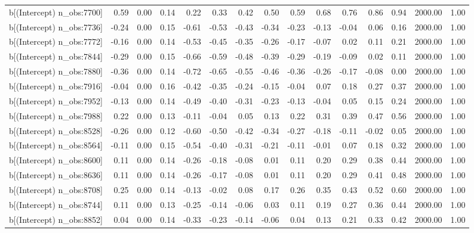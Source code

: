 \begin{table}[ht]
\begin{tabular}{rrrrrrrrrrrrrrr}
  b[(Intercept) n\_obs:7700] & 0.59 & 0.00 & 0.14 & 0.22 & 0.33 & 0.42 & 0.50 & 0.59 & 0.68 & 0.76 & 0.86 & 0.94 & 2000.00 & 1.00 \\ 
  b[(Intercept) n\_obs:7736] & -0.24 & 0.00 & 0.15 & -0.61 & -0.53 & -0.43 & -0.34 & -0.23 & -0.13 & -0.04 & 0.06 & 0.16 & 2000.00 & 1.00 \\ 
  b[(Intercept) n\_obs:7772] & -0.16 & 0.00 & 0.14 & -0.53 & -0.45 & -0.35 & -0.26 & -0.17 & -0.07 & 0.02 & 0.11 & 0.21 & 2000.00 & 1.00 \\ 
  b[(Intercept) n\_obs:7844] & -0.29 & 0.00 & 0.15 & -0.66 & -0.59 & -0.48 & -0.39 & -0.29 & -0.19 & -0.09 & 0.02 & 0.11 & 2000.00 & 1.00 \\ 
  b[(Intercept) n\_obs:7880] & -0.36 & 0.00 & 0.14 & -0.72 & -0.65 & -0.55 & -0.46 & -0.36 & -0.26 & -0.17 & -0.08 & 0.00 & 2000.00 & 1.00 \\ 
  b[(Intercept) n\_obs:7916] & -0.04 & 0.00 & 0.16 & -0.42 & -0.35 & -0.24 & -0.15 & -0.04 & 0.07 & 0.18 & 0.27 & 0.37 & 2000.00 & 1.00 \\ 
  b[(Intercept) n\_obs:7952] & -0.13 & 0.00 & 0.14 & -0.49 & -0.40 & -0.31 & -0.23 & -0.13 & -0.04 & 0.05 & 0.15 & 0.24 & 2000.00 & 1.00 \\ 
  b[(Intercept) n\_obs:7988] & 0.22 & 0.00 & 0.13 & -0.11 & -0.04 & 0.05 & 0.13 & 0.22 & 0.31 & 0.39 & 0.47 & 0.56 & 2000.00 & 1.00 \\ 
  b[(Intercept) n\_obs:8528] & -0.26 & 0.00 & 0.12 & -0.60 & -0.50 & -0.42 & -0.34 & -0.27 & -0.18 & -0.11 & -0.02 & 0.05 & 2000.00 & 1.00 \\ 
  b[(Intercept) n\_obs:8564] & -0.11 & 0.00 & 0.15 & -0.54 & -0.40 & -0.31 & -0.21 & -0.11 & -0.01 & 0.07 & 0.18 & 0.32 & 2000.00 & 1.00 \\ 
  b[(Intercept) n\_obs:8600] & 0.11 & 0.00 & 0.14 & -0.26 & -0.18 & -0.08 & 0.01 & 0.11 & 0.20 & 0.29 & 0.38 & 0.44 & 2000.00 & 1.00 \\ 
  b[(Intercept) n\_obs:8636] & 0.11 & 0.00 & 0.14 & -0.26 & -0.17 & -0.08 & 0.01 & 0.11 & 0.20 & 0.29 & 0.41 & 0.48 & 2000.00 & 1.00 \\ 
  b[(Intercept) n\_obs:8708] & 0.25 & 0.00 & 0.14 & -0.13 & -0.02 & 0.08 & 0.17 & 0.26 & 0.35 & 0.43 & 0.52 & 0.60 & 2000.00 & 1.00 \\ 
  b[(Intercept) n\_obs:8744] & 0.11 & 0.00 & 0.13 & -0.25 & -0.14 & -0.06 & 0.03 & 0.11 & 0.19 & 0.27 & 0.36 & 0.44 & 2000.00 & 1.00 \\ 
  b[(Intercept) n\_obs:8852] & 0.04 & 0.00 & 0.14 & -0.33 & -0.23 & -0.14 & -0.06 & 0.04 & 0.13 & 0.21 & 0.33 & 0.42 & 2000.00 & 1.00 \\ 

\end{tabular}
\end{table}
